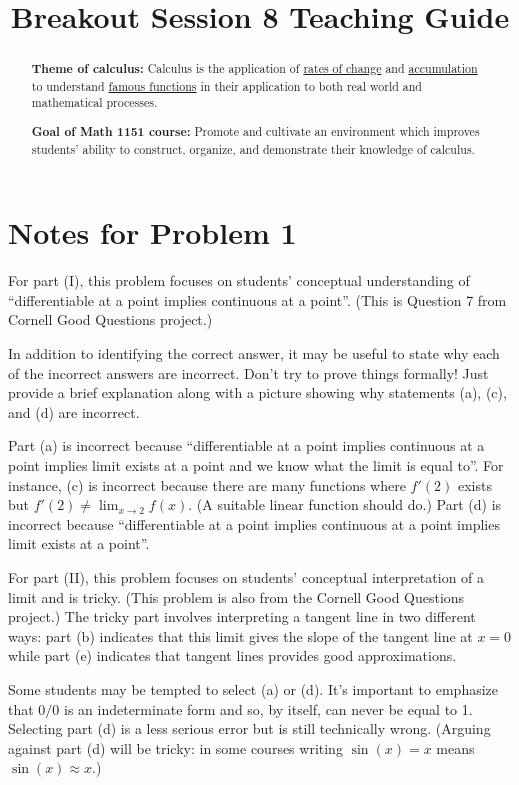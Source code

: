 \documentclass[handout,nooutcomes]{ximera}
\title{Breakout Session 8 Teaching Guide}
\begin{document}
\begin{abstract}
 \textbf{Theme of calculus:} Calculus is the application of  \href{https://en.wikipedia.org/wiki/Derivative}{rates of change} and \href{https://en.wikipedia.org/wiki/Integral}{accumulation} to understand \href{https://en.wikipedia.org/wiki/Elementary_function}{famous functions} in their application to both real world and mathematical processes.

  \textbf{Goal of Math 1151 course:} Promote and cultivate an environment which improves students' ability to construct, organize, and demonstrate their knowledge of calculus.
\end{abstract}
\maketitle

\section{Notes for Problem 1}
For part (I), this problem focuses on students' conceptual understanding of ``differentiable at a point implies continuous at a point''.
(This is Question 7 from Cornell Good Questions project.)

In addition to identifying the correct answer, it may be useful to state why each of the incorrect answers are incorrect.
Don't try to prove things formally!
Just provide a brief explanation along with a picture showing why statements (a), (c), and (d) are incorrect.

Part (a) is incorrect because ``differentiable at a point implies continuous at a point implies limit exists at a point and we know what the limit is equal to''.
For instance, (c) is incorrect because there are many functions where $f'(2)$ exists but $f'(2) \ne \lim_{x \to 2} f(x)$.
(A suitable linear function should do.)
Part (d) is incorrect because ``differentiable at a point implies continuous at a point implies limit exists at a point''.

For part (II), this problem focuses on students' conceptual interpretation of a limit and is tricky.
(This problem is also from the Cornell Good Questions project.)
The tricky part involves interpreting a tangent line in two different ways: part (b) indicates that this limit gives the slope of the tangent line at $x = 0$ while part (e) indicates that tangent lines provides good approximations.

Some students may be tempted to select (a) or (d).
It's important to emphasize that $0/0$ is an indeterminate form and so, by itself, can never be equal to 1.
Selecting part (d) is a less serious error but is still technically wrong.
(Arguing against part (d) will be tricky: in some courses writing $\sin(x) = x$ means $\sin(x) \approx x$.)
\end{document}

